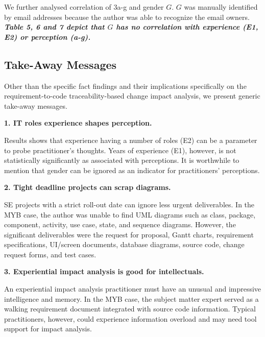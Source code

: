 \documentclass[conference]{IEEEtran}
\begin{document}
We further analysed correlation of 3a-g and gender $G$. $G$ was
manually identified by email addresses because the author was able to
recognize the email owners.  \textbf{\textit{Table 5, 6 and 7 depict
    that $G$ has no correlation with experience (E1, E2) or perception
    (a-g).}}



\subsection{Take-Away Messages}

Other than the specific fact findings and their implications
specifically on the requirement-to-code traceability-based change
impact analysis, we present generic take-away messages.

\begin{center}
  \textbf{1. IT roles experience shapes perception.}
\end{center}
  
Results shows that experience having a number of roles (E2) can be a
parameter to probe practitioner's thoughts. Years of experience (E1),
however, is not statistically significantly as associated with
perceptions. It is worthwhile to mention that gender can be ignored as
an indicator for practitioners' perceptions.

\begin{center}
  \textbf{2. Tight deadline projects can scrap diagrams.} 
\end{center}
  
SE projects with a strict roll-out date can ignore less urgent
deliverables. In the MYB case, the author was unable to find UML
diagrams such as class, package, component, activity, use case, state,
and sequence diagrams. However, the significant deliverables were the
request for proposal, Gantt charts, requirement specifications,
UI/screen documents, database diagrams, source code, change request
forms, and test cases.

\begin{center}
  \textbf{3. Experiential impact analysis is good for intellectuals.} 
\end{center}

An experiential impact analysis practitioner must have an unusual and
impressive intelligence and memory. In the MYB case, the subject
matter expert served as a walking requirement document integrated with
source code information. Typical practitioners, however, could
experience information overload and may need tool support for impact
analysis.
\end{document}

